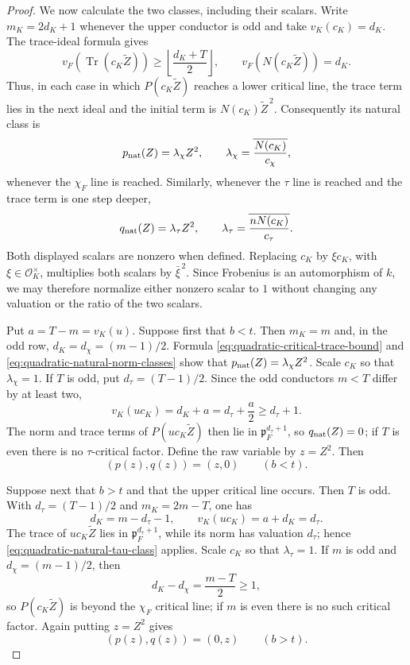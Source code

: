 \documentclass[11pt]{amsart}
\theoremstyle{definition}
\theoremstyle{remark}
\newcommand{\cO}{\mathcal O}
\newcommand{\p}{\mathfrak p}
\newcommand{\Tr}{\operatorname{Tr}}
\begin{document}
\begin{proof}
We now calculate the two classes, including their scalars.  Write
$m_K=2d_K+1$ whenever the upper conductor is odd and take
$v_K(c_K)=d_K$.  The trace-ideal formula gives
\begin{equation}\label{eq:quadratic-critical-trace-bound}
 v_F(\Tr(c_K\widetilde Z))
 \ge \left\lfloor\frac{d_K+T}{2}\right\rfloor,
 \qquad
 v_F(N(c_K\widetilde Z))=d_K.
\end{equation}
Thus, in each case in which $P(c_K\widetilde Z)$ reaches a lower
critical line, the trace term lies in the next ideal and the initial
term is $N(c_K)\widetilde Z^{\,2}$.  Consequently its natural class is
\begin{equation}\label{eq:quadratic-natural-norm-classes}
 p_{\rm nat}(Z)=\lambda_\chi Z^2,
 \qquad
 \lambda_\chi=\overline{\frac{N(c_K)}{c_\chi}},
\end{equation}
whenever the $\chi_F$ line is reached.  Similarly, whenever the
$\tau$ line is reached and the trace term is one step deeper,
\begin{equation}\label{eq:quadratic-natural-tau-class}
 q_{\rm nat}(Z)=\lambda_\tau Z^2,
 \qquad
 \lambda_\tau=\overline{\frac{nN(c_K)}{c_\tau}}.
\end{equation}
Both displayed scalars are nonzero when defined.  Replacing $c_K$ by
$\xi c_K$, with $\xi\in\cO_K^\times$, multiplies both scalars by
$\bar\xi^{\,2}$.  Since Frobenius is an automorphism of $k$, we may
therefore normalize either nonzero scalar to $1$ without changing any
valuation or the ratio of the two scalars.

Put $a=T-m=v_K(u)$.  Suppose first that $b<t$.  Then $m_K=m$ and, in
the odd row, $d_K=d_\chi=(m-1)/2$.  Formula
\eqref{eq:quadratic-critical-trace-bound} and
\eqref{eq:quadratic-natural-norm-classes} show that
$p_{\rm nat}(Z)=\lambda_\chi Z^2$.  Scale $c_K$ so that
$\lambda_\chi=1$.  If $T$ is odd, put $d_\tau=(T-1)/2$.  Since the
odd conductors $m<T$ differ by at least two,
\[
 v_K(uc_K)=d_K+a=d_\tau+\frac a2\ge d_\tau+1.
\]
The norm and trace terms of $P(uc_K\widetilde Z)$ then lie in
$\p_F^{d_\tau+1}$, so $q_{\rm nat}(Z)=0$; if $T$ is even there is no
$\tau$-critical factor.  Define the raw variable by $z=Z^2$.  Then
\begin{equation}\label{eq:quadratic-raw-classes-below}
 (p(z),q(z))=(z,0)\qquad(b<t).
\end{equation}

Suppose next that $b>t$ and that the upper critical line occurs.  Then
$T$ is odd.  With $d_\tau=(T-1)/2$ and
$m_K=2m-T$, one has
\[
 d_K=m-d_\tau-1,
 \qquad
 v_K(uc_K)=a+d_K=d_\tau.
\]
The trace of $uc_K\widetilde Z$ lies in
$\p_F^{d_\tau+1}$, while its norm has valuation $d_\tau$; hence
\eqref{eq:quadratic-natural-tau-class} applies.  Scale $c_K$ so that
$\lambda_\tau=1$.  If $m$ is odd and $d_\chi=(m-1)/2$, then
\[
 d_K-d_\chi=\frac{m-T}{2}\ge1,
\]
so $P(c_K\widetilde Z)$ is beyond the $\chi_F$ critical line; if $m$
is even there is no such critical factor.  Again putting $z=Z^2$
gives
\begin{equation}\label{eq:quadratic-raw-classes-above}
 (p(z),q(z))=(0,z)\qquad(b>t).
\end{equation}


\end{proof}
\end{document}
